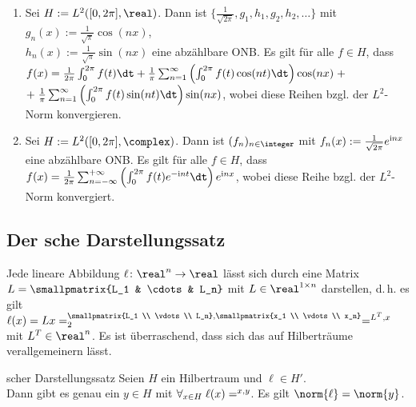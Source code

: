 \begin{Bsp}
    \begin{enumerate}[label=\emph{(\alph*)}]
        \item
        Sei $H := L^2([0, 2\pi], \real)$.
        Dann ist $\{\frac{1}{\sqrt{2\pi}}, g_1, h_1, g_2, h_2, \dotsc\}$
        mit $g_n(x) := \frac{1}{\sqrt{\pi}} \cos(nx)$,\\
        $h_n(x) := \frac{1}{\sqrt{\pi}} \sin(nx)$
        eine abzählbare ONB.
        Es gilt für alle $f \in H$, dass\\
        $f(x) = \frac{1}{2\pi} \int_0^{2\pi} f(t)\dt +
        \frac{1}{\pi} \sum_{n=1}^\infty \left(\int_0^{2\pi} f(t)\cos(nt)\dt\right) \cos(nx) \;+$\\
        $+\; \frac{1}{\pi} \sum_{n=1}^\infty \left(\int_0^{2\pi} f(t)\sin(nt)\dt\right) \sin(nx)$,
        wobei diese Reihen bzgl. der $L^2$-Norm konvergieren.

        \item
        Sei $H := L^2([0, 2\pi], \complex)$.
        Dann ist $(f_n)_{n \in \integer}$ mit $f_n(x) := \frac{1}{\sqrt{2\pi}} e^{\mathrm{i} nx}$
        eine abzählbare ONB.
        Es gilt für alle $f \in H$, dass
        $f(x) = \frac{1}{2\pi} \sum_{n=-\infty}^{+\infty}
        \left(\int_0^{2\pi} f(t) e^{-\iu nt} \dt\right) e^{\iu nx}$,
        wobei diese Reihe bzgl. der $L^2$-Norm konvergiert.
    \end{enumerate}
\end{Bsp}

\pagebreak

\subsection{%
    Der sche Darstellungssatz%
}

\begin{Bem}
    Jede lineare Abbildung $\ell\colon \real^n \rightarrow \real$ lässt sich durch eine
    Matrix $L = \smallpmatrix{L_1 & \cdots & L_n}$ mit $L \in \real^{1 \times n}$ darstellen,
    d.\,h. es gilt $\ell(x) = Lx = \sp{\smallpmatrix{L_1 \\ \vdots \\ L_n},
    \smallpmatrix{x_1 \\ \vdots \\ x_n}}_2 = \sp{L^T, x}$ mit $L^T \in \real^n$.
    Es ist überraschend, dass sich das auf Hilberträume verallgemeinern lässt.
\end{Bem}

\begin{Satz}{scher Darstellungssatz}
    Seien $H$ ein Hilbertraum und $\ell \in H'$.\\
    Dann gibt es genau ein $y \in H$ mit $\forall_{x \in H}\; \ell(x) = \sp{x, y}$.
    Es gilt $\norm{\ell} = \norm{y}$.
\end{Satz}

